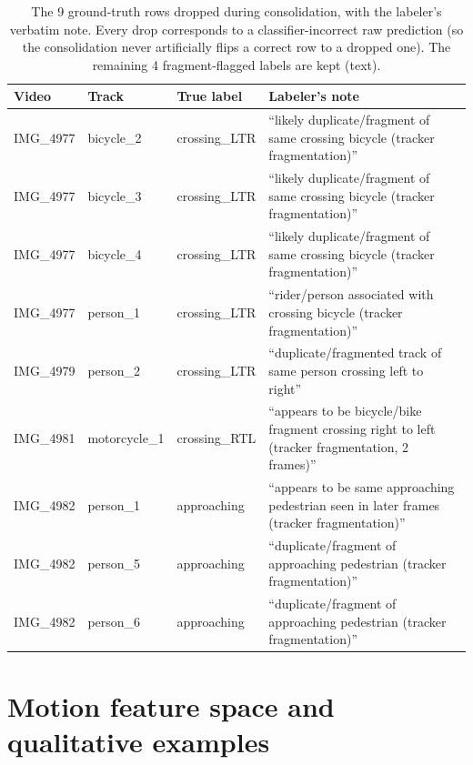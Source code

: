 \documentclass[10pt,twocolumn,letterpaper]{article}
\begin{document}
\begin{table}[h]
  \centering\footnotesize
  \caption{The 9 ground-truth rows dropped during consolidation, with
  the labeler's verbatim note. Every drop corresponds to a
  classifier-incorrect raw prediction (so the consolidation never
  artificially flips a correct row to a dropped one). The remaining
  4 fragment-flagged labels are kept (text).}
  \label{tab:cons}
  \begin{tabular}{lll p{}}
    \toprule
    \textbf{Video} & \textbf{Track} & \textbf{True label} & \textbf{Labeler's note} \\
    \midrule
    IMG\_4977 & bicycle\_2   & crossing\_LTR & ``likely duplicate/fragment of same crossing bicycle (tracker fragmentation)'' \\
    IMG\_4977 & bicycle\_3   & crossing\_LTR & ``likely duplicate/fragment of same crossing bicycle (tracker fragmentation)'' \\
    IMG\_4977 & bicycle\_4   & crossing\_LTR & ``likely duplicate/fragment of same crossing bicycle (tracker fragmentation)'' \\
    IMG\_4977 & person\_1    & crossing\_LTR & ``rider/person associated with crossing bicycle (tracker fragmentation)'' \\
    IMG\_4979 & person\_2    & crossing\_LTR & ``duplicate/fragmented track of same person crossing left to right'' \\
    IMG\_4981 & motorcycle\_1 & crossing\_RTL & ``appears to be bicycle/bike fragment crossing right to left (tracker fragmentation, 2 frames)'' \\
    IMG\_4982 & person\_1    & approaching   & ``appears to be same approaching pedestrian seen in later frames (tracker fragmentation)'' \\
    IMG\_4982 & person\_5    & approaching   & ``duplicate/fragment of approaching pedestrian (tracker fragmentation)'' \\
    IMG\_4982 & person\_6    & approaching   & ``duplicate/fragment of approaching pedestrian (tracker fragmentation)'' \\
    \bottomrule
  \end{tabular}
\end{table}

\section{Motion feature space and qualitative examples}
\label{app:qual}
\end{document}
